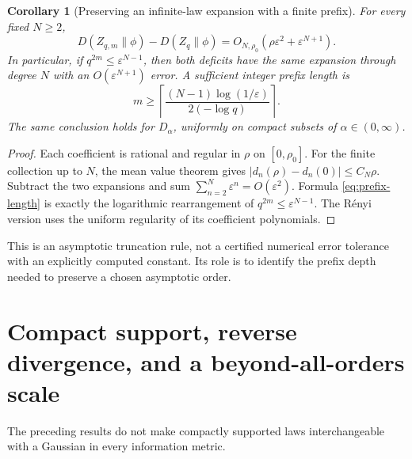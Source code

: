 \documentclass[11pt,a4paper]{article}
\numberwithin{equation}{section}
\newtheorem{corollary}[theorem]{Corollary}
\theoremstyle{definition}
\theoremstyle{remark}
\newcommand{\eps}{\varepsilon}
\begin{document}
\begin{corollary}[Preserving an infinite-law expansion with a finite prefix]
\label{cor:prefix-rule}
For every fixed $N\ge2$,
\begin{equation}
 D(Z_{q,m}\|\phi)-D(Z_q\|\phi)
 =O_{N,\rho_0}(\rho\eps^2+\eps^{N+1}).
 \label{eq:prefix-difference}
\end{equation}
In particular, if $q^{2m}\le\eps^{N-1}$, then both deficits have the same
expansion through degree $N$ with an $O(\eps^{N+1})$ error. A sufficient
integer prefix length is
\begin{equation}
 m\ge
 \left\lceil\frac{(N-1)\log(1/\eps)}{2(-\log q)}\right\rceil.
 \label{eq:prefix-length}
\end{equation}
The same conclusion holds for $D_\alpha$, uniformly on compact subsets of
$\alpha\in(0,\infty)$.
\end{corollary}
\begin{proof}
Each coefficient is rational and regular in $\rho$ on $[0,\rho_0]$.
For the finite collection up to $N$, the mean value theorem gives
$|d_n(\rho)-d_n(0)|\le C_N\rho$. Subtract the two expansions and sum
$\sum_{n=2}^{N}\eps^n=O(\eps^2)$. Formula \eqref{eq:prefix-length} is
exactly the logarithmic rearrangement of $q^{2m}\le\eps^{N-1}$.
The R\'enyi version uses the uniform regularity of its coefficient polynomials.
\end{proof}

This is an asymptotic truncation rule, not a certified numerical error tolerance
with an explicitly computed constant. Its role is to identify the prefix depth
needed to preserve a chosen asymptotic order.

\section{Compact support, reverse divergence, and a beyond-all-orders scale}
\label{sec:support}

The preceding results do not make compactly supported laws interchangeable
with a Gaussian in every information metric.
\end{document}
